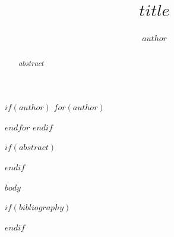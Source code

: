 \documentclass[review,12pt]{elsarticle}
\begin{document}
\begin{frontmatter}
\title{$title$}
$if(author)$
$for(author)$\author{$author$}
$endfor$
$endif$

$if(abstract)$
\begin{abstract}
$abstract$
\end{abstract}
$endif$

\end{frontmatter}

\linenumbers
$body$

$if(bibliography)$


$endif$
\end{document}
